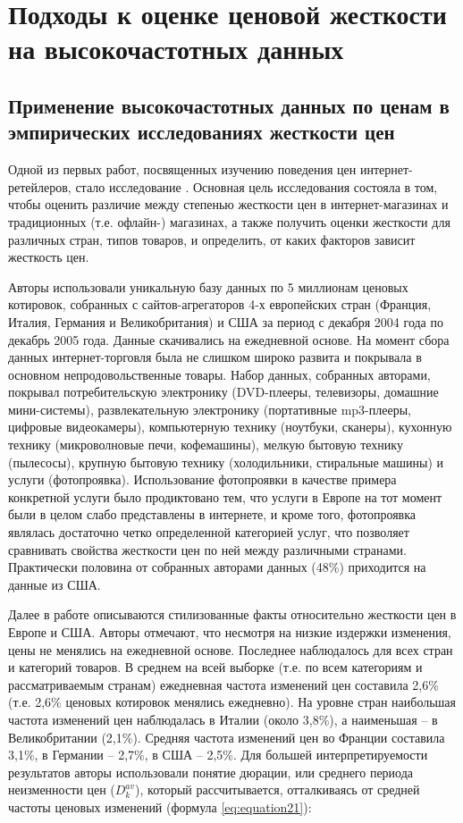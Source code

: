 \chapter{Подходы к оценке ценовой жесткости на высокочастотных данных}\label{ch:ch2}

\section{Применение высокочастотных данных по ценам в эмпирических исследованиях жесткости цен}
\label{sec:ch2/sec1}

Одной из первых работ, посвященных изучению поведения цен интернет-ретейлеров, стало исследование \cite{RePEc:ecb:ecbwps:2006645}. Основная цель исследования состояла в том, чтобы оценить различие между степенью жесткости цен в интернет-магазинах и традиционных (т.е. офлайн-) магазинах, а также получить оценки жесткости для различных стран, типов товаров, и определить, от каких факторов зависит жесткость цен.

Авторы использовали уникальную базу данных по 5 миллионам ценовых котировок, собранных с сайтов-агрегаторов 4-х европейских стран (Франция, Италия, Германия и Великобритания) и США за период с декабря 2004 года по декабрь 2005 года. Данные скачивались на ежедневной основе. На момент сбора данных интернет-торговля была не слишком широко развита и покрывала в основном непродовольственные товары. Набор данных, собранных авторами, покрывал потребительскую электронику (DVD-плееры, телевизоры, домашние мини-системы), развлекательную электронику (портативные mp3-плееры, цифровые видеокамеры), компьютерную технику (ноутбуки, сканеры), кухонную технику (микроволновые печи, кофемашины), мелкую бытовую технику (пылесосы), крупную бытовую технику (холодильники, стиральные машины) и услуги (фотопроявка). Использование фотопроявки в качестве примера конкретной услуги было продиктовано тем, что услуги в Европе на тот момент были в целом слабо представлены в интернете, и кроме того, фотопроявка являлась достаточно четко определенной категорией услуг, что позволяет сравнивать свойства жесткости цен по ней между различными странами. Практически половина от собранных авторами данных (48\%) приходится на данные из США.

Далее в работе описываются стилизованные факты относительно жесткости цен в Европе и США. Авторы отмечают, что несмотря на низкие издержки изменения, цены не менялись на ежедневной основе. Последнее наблюдалось для всех стран и категорий товаров. В среднем на всей выборке (т.е. по всем категориям и рассматриваемым странам) ежедневная частота изменений цен составила 2,6\% (т.е. 2,6\% ценовых котировок менялись ежедневно). На уровне стран наибольшая частота изменений цен наблюдалась в Италии (около 3,8\%), а наименьшая – в Великобритании (2,1\%). Средняя частота изменений цен во Франции составила 3,1\%, в Германии – 2,7\%, в США – 2,5\%. Для большей интерпретируемости результатов авторы использовали понятие дюрации, или среднего периода неизменности цен ($D^{av}_{k}$), который рассчитывается, отталкиваясь от средней частоты ценовых изменений (формула \eqref{eq:equation21}):

